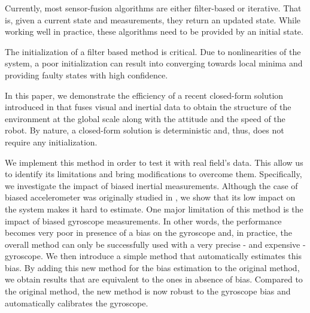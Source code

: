 \documentclass[letterpaper, 10 pt, conference]{ieeeconf}  %
\begin{document}
Currently, most sensor-fusion algorithms are either filter-based or iterative. That is, given a current state and measurements, they return an updated state.
While working well in practice, these algorithms need to be provided by an initial state.

The initialization of a filter based method is critical.
Due to nonlinearities of the system, a poor initialization can result into converging towards local minima and  providing faulty states with high confidence.

In this paper, we demonstrate the efficiency of a recent closed-form solution introduced in \cite{Martinelli2012}\cite{Martinelli2014} that fuses visual and inertial data to obtain the structure of the environment at the global scale along with the attitude and the speed of the robot.
By nature, a closed-form solution is deterministic and, thus, does not require any initialization.


We implement this method in order to test it with real field's data.
This allow us to identify its limitations and bring modifications to overcome them.
Specifically, we investigate the impact of biased inertial measurements.
Although the case of biased accelerometer was originally studied in \cite{Martinelli2014}, we show that its low impact on the system makes it hard to estimate. One major limitation of this method is the impact of biased gyroscope measurements.
In other words, the performance becomes very poor in presence of a bias on the gyroscope and, in practice, the overall method can only be successfully used with a very precise - and expensive - gyroscope.
We then introduce a simple method that automatically estimates this bias. By adding this new method for the bias estimation to the original method, we obtain results that are equivalent to the ones in absence of bias.
Compared to the original method, the new method is now robust to the gyroscope bias and automatically calibrates the gyroscope.


\end{document}
